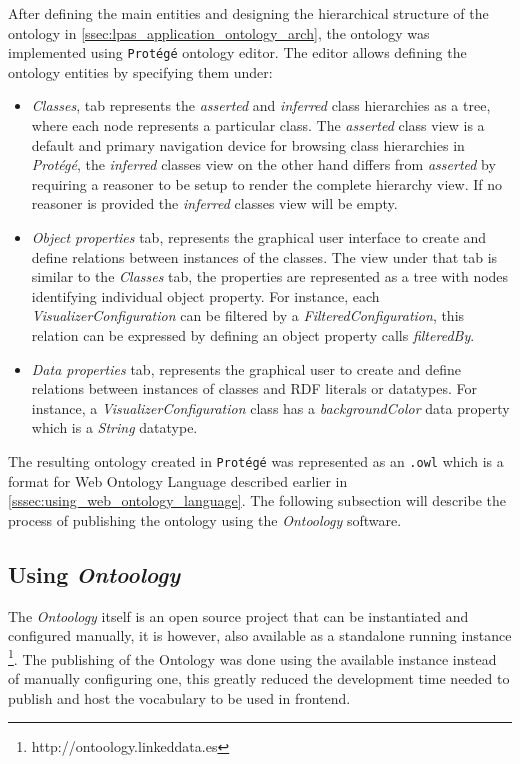 After defining the main entities and designing the hierarchical structure of the ontology in \autoref{ssec:lpas_application_ontology_arch}, the ontology was implemented using \texttt{Protégé} ontology editor. The editor allows defining the ontology entities by specifying them under:
\begin{itemize}
	\item \textit{Classes}, tab represents the \textit{asserted} and \textit{inferred} class hierarchies as a tree, where each node represents a particular class. The \textit{asserted} class view is a default and primary navigation device for browsing class hierarchies in \textit{Protégé}, the \textit{inferred} classes view on the other hand differs from \textit{asserted} by requiring a reasoner to be setup to render the complete hierarchy view. If no reasoner is provided the \textit{inferred} classes view will be empty.
	\item \textit{Object properties} tab,  represents the graphical user interface to create and define relations between instances of the classes. The view under that tab is similar to the \textit{Classes} tab, the properties are represented as a tree with nodes identifying individual object property. For instance, each \textit{VisualizerConfiguration} can be filtered by a \textit{FilteredConfiguration}, this relation can be expressed by defining an object property calls \textit{filteredBy}.
	\item \textit{Data properties} tab, represents the graphical user to create and define relations between instances of classes and RDF literals or datatypes. For instance, a \textit{VisualizerConfiguration} class has a \textit{backgroundColor} data property which is a \textit{String} datatype. 
\end{itemize}

The resulting ontology created in \texttt{Protégé} was represented as an \texttt{.owl} which is a format for Web Ontology Language described earlier in \autoref{sssec:using_web_ontology_language}. The following subsection will describe the process of publishing the ontology using the \textit{Ontoology} software. 

\subsection{Using \textit{Ontoology}}

The \textit{Ontoology} itself is an open source project that can be instantiated and configured manually, it is however, also available as a standalone running instance \footnote{http://ontoology.linkeddata.es}. The publishing of the \lpas{} Ontology was done using the available instance instead of manually configuring one, this greatly reduced the development time needed to publish and host the vocabulary to be used in \lpa{} frontend.

